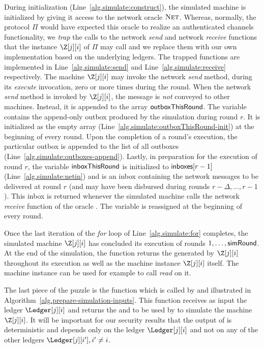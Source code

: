 During initialization (Line~\ref{alg.simulate:construct}),
the simulated machine is
initialized by giving it access to the network oracle $\textsc{Net}$.
Whereas, normally, the protocol $\Pi$ would have expected this
oracle to realize an authenticated channels functionality, we
\emph{trap} the calls to the network \emph{send} and network
\emph{receive} functions that the instance $\Z[j][i]$ of $\Pi$
may call and we replace them with our own implementation based on
the underlying ledgers. The trapped functions are implemented
in Line~\ref{alg.simulate:send} and Line~\ref{alg.simulate:receive}
respectively. The machine $\Z[j][i]$ may invoke the network
\emph{send} method, during its \emph{execute} invocation, zero
or more times during the round. When the network \emph{send} method
is invoked by $\Z[j][i]$, the message is \emph{not} conveyed
to other machines. Instead, it is appended to the array
$\textsf{outboxThisRound}$. The variable contains the append-only
outbox produced by the simulation during round $r$. It is
initialized as the empty array
(Line~\ref{alg.simulate:outboxThisRound-init}) at the beginning
of every round. Upon the completion of a round's execution,
the particular outbox is appended to the list of all outboxes
(Line~\ref{alg.simulate:outboxes-append}).
Lastly, in preparation for the execution of round $r$,
the variable $\textsf{inboxThisRound}$ is initialized to
$\textsf{inboxes}[r - 1]$ (Line~\ref{alg.simulate:netin})
and is an inbox containing the network messages to be
delivered at round $r$ (and may have been disbursed during
rounds $r - \Delta, \ldots, r - 1$). This inbox is returned
whenever the simulated machine calls the network \emph{receive}
function of the oracle \net. The variable \inboxThisRound
is reassigned at the beginning of every round.

Once the last iteration of the \emph{for} loop of Line~\ref{alg.simulate:for} completes,
the simulated machine $\Z[j][i]$ has concluded its execution of rounds $1, \ldots, \textsf{simRound}$.
At the end of the simulation, the \simulate function returns the \outboxes generated by
$\Z[j][i]$ throughout its execution as well as the machine instance $\Z[j][i]$ itself.
The machine instance can be used for example to call \emph{read} on it.

The last piece of the puzzle is the \prepareSimulationInputs function which is
called by \simulate and illustrated in Algorithm~\ref{alg.prepare-simulation-inputs}. This function receives as input the ledger $\Ledger[j][i]$ and
returns the \writeboxes and \inboxes to be used by \simulate to simulate the machine $\Z[j][i]$. It will be important for
our security results that the output of \prepareSimulationInputs is deterministic
and depends only on the ledger $\Ledger[j][i]$ and not on any of the other ledgers $\Ledger[j][i'], i' \neq i$.


